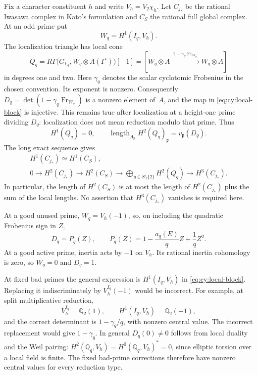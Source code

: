 Fix a character constituent $h$ and write $V_h=V_2\chi_h$.  Let $C_{j_*}$
be the rational Iwasawa complex in Kato's formulation and $C_S$ the
rational full global complex.  At an odd prime put
\[
 W_q=H^1(I_q,V_h).
\]
The localization triangle has local cone
\begin{equation}\label{eq:cy:local-block}
 Q_q=R\Gamma\bigl(G_{\mathbb F _q},
                   W_q\otimes A(\Gamma^\iota)\bigr)[-1]
   =\left[W_q\otimes A
       \xrightarrow{\ 1-\gamma_q\operatorname{Fr}_{W_q}\ }
             W_q\otimes A\right]
\end{equation}
in degrees one and two.  Here $\gamma_q$ denotes the scalar cyclotomic
Frobenius in the chosen convention.  Its exponent is nonzero.  Consequently
$D_q=\det(1-\gamma_q\operatorname{Fr}_{W_q})$ is a nonzero element of~$A$,
and the map in \eqref{eq:cy:local-block} is injective.  This remains true
after localization at a height-one prime dividing $D_q$: localization
does not mean reduction modulo that prime.  Thus
\[
 H^1(Q_q)=0,\qquad
 \operatorname{length}_{A_{\mathfrak p}}H^2(Q_q)_{\mathfrak p}
       =v_{\mathfrak p}(D_q).
\]
The long exact sequence gives
\begin{equation}\label{eq:cy:local-sequence}
 \begin{gathered}
 H^1(C_{j_*})\simeq H^1(C_S),\\
 0\longrightarrow H^2(C_{j_*})\longrightarrow H^2(C_S)
       \longrightarrow\bigoplus_{q\in S\setminus\{2\}}H^2(Q_q)
       \longrightarrow H^3(C_{j_*}).
 \end{gathered}
\end{equation}
In particular, the length of $H^2(C_S)$ is at most the length of
$H^2(C_{j_*})$ plus the sum of the local lengths.  No assertion that
$H^3(C_{j_*})$ vanishes is required here.

At a good unused prime, $W_q=V_h(-1)$, so, on including the quadratic
Frobenius sign in $Z$,
\begin{equation}\label{eq:cy:local-euler}
 D_q=P_q(Z),\qquad P_q(Z)=1-\frac{a_q(E)}q Z+\frac1q Z^2.
\end{equation}
At a good active prime, inertia acts by $-1$ on $V_h$.  Its rational
inertia cohomology is zero, so $W_q=0$ and $D_q=1$.

At fixed bad primes the general expression is $H^1(I_q,V_h)$ in
\eqref{eq:cy:local-block}.  Replacing it indiscriminately by $V_h^{I_q}(-1)$
would be incorrect.  For example, at split multiplicative reduction,
\[
 V_h^{I_q}=\mathbb Q _2(1),\qquad
 H^1(I_q,V_h)=\mathbb Q _2(-1),
\]
and the correct determinant is $1-\gamma_q/q$, with nonzero central
value.  The incorrect replacement would give $1-\gamma_q$.
In general $D_q(0)\ne0$ follows from local duality and the Weil pairing:
$H^2(\mathbb Q _q,V_h)=H^0(\mathbb Q _q,V_h)^*=0$, since elliptic torsion
over a local field is finite.  The fixed bad-prime corrections therefore
have nonzero central values for every reduction type.

